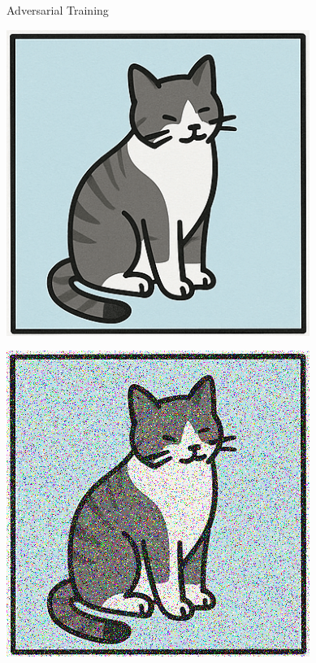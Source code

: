 \begin{frame}{Adversarial Training}
    \begin{minipage}{0.15\textwidth}
        \includegraphics[width=\textwidth]{assets/input_cat.png}
    \end{minipage}
    \hfill
    \begin{minipage}{0.15\textwidth}
        \includegraphics[width=\textwidth]{assets/input_cat_noise.png}

\end{minipage}
\end{frame}
